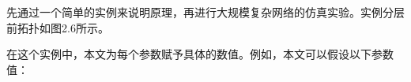 \documentclass[UTF8,a4paper,12pt]{ctexart}
\numberwithin{equation}{section}
\begin{document}
	先通过一个简单的实例来说明原理，再进行大规模复杂网络的仿真实验。实例分层前拓扑如图2.6所示。
	\begin{figure}[htb]
	\end{figure}
	
	在这个实例中，本文为每个参数赋予具体的数值。例如，本文可以假设以下参数值：
	
\end{document}
